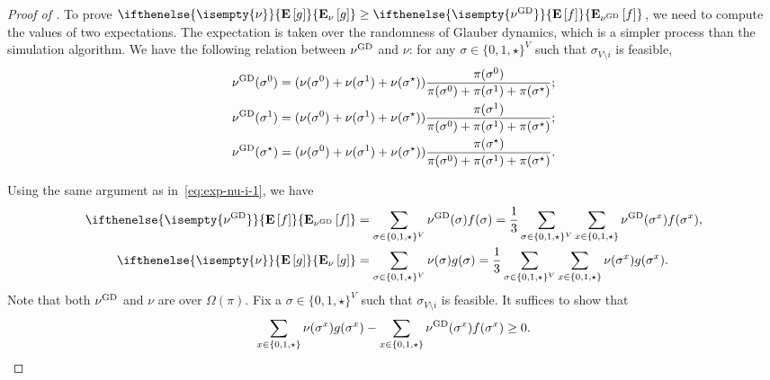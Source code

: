 \documentclass[11pt,a4paper]{article}
\theoremstyle{definition}
\newcommand{\nug}{\nu^{\textnormal{GD}}}
\newcommand{\E}[2][]{ \ifthenelse{\isempty{#1}}
  {\mathbf{\mathbf{E}}\left[#2\right]}
  {\mathbf{\mathbf{E}}_{#1}\left[#2\right]} }
\begin{document}
\begin{proof}[Proof of ]
To prove $\E[\nu]{g}\geq \E[\nug]{f}$, we need to compute the values of two expectations.
The expectation is taken over the randomness of Glauber dynamics, which is a simpler process than the simulation algorithm.
We have the following relation between $\nug$ and $\nu$: for any $\sigma \in \{0,1,\star\}^V$ such that $\sigma_{V \setminus i}$ is feasible,
\begin{align*}
&\nug(\sigma^0) =(\nu(\sigma^0)+\nu(\sigma^1)+\nu(\sigma^\star))\frac{\pi(\sigma^0)}{\pi(\sigma^0)+\pi(\sigma^1)+\pi(\sigma^\star)};\\
&\nug(\sigma^1) =(\nu(\sigma^0)+\nu(\sigma^1)+\nu(\sigma^\star))\frac{\pi(\sigma^1)}{\pi(\sigma^0)+\pi(\sigma^1)+\pi(\sigma^\star)};\\
&\nug(\sigma^\star) =(\nu(\sigma^0)+\nu(\sigma^1)+\nu(\sigma^\star))\frac{\pi(\sigma^\star)}{\pi(\sigma^0)+\pi(\sigma^1)+\pi(\sigma^\star)}.
\end{align*}

Using the same argument as in~\eqref{eq:exp-nu-i-1}, we have 
\begin{align*}
    \E[\nug]{f}&=\sum_{\sigma\in \{0,1,\star\}^V} \nug(\sigma)f(\sigma)=\frac{1}{3} \sum_{\sigma\in \{0,1,\star\}^V}\sum_{x\in\{0,1,\star\} } \nug(\sigma^x)f(\sigma^x),\\
    \E[\nu]{g}&=\sum_{\sigma\in \{0,1,\star\}^V} \nu(\sigma)g(\sigma)=\frac{1}{3} \sum_{\sigma\in \{0,1,\star\}^V}\sum_{x\in\{0,1,\star\} } \nu(\sigma^x)g(\sigma^x). 
\end{align*}
Note that both $\nug$ and $\nu$ are over $\Omega(\pi)$.
Fix a $\sigma \in \{0,1,\star\}^V$ such that $\sigma_{V \setminus i}$ is feasible. It suffices to show that 
\begin{align}\label{eq:ineq-eta-tilde-eta}
    \sum_{x\in \{0,1,\star\}}\nu(\sigma^x) g(\sigma^x)-\sum_{x\in \{0,1,\star\}}\nug(\sigma^x) f(\sigma^x)\geq 0.    
\end{align}


\end{proof}
\end{document}
